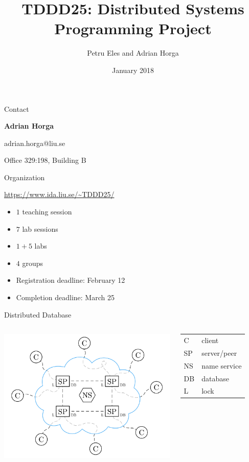 \documentclass[compress,xcolor=table]{beamer}
\title{%
  TDDD25: Distributed Systems\\%
  \vspace{0.1em}%
  Programming Project%
}
\author{Petru Eles and Adrian Horga}
\date{January 2018}
\institute[Link\"oping University]{
  Computer and Information Science\\
  Link\"oping University
}
\begin{document}
\frame[plain]{\titlepage}

\begin{frame}{Contact}
\begin{center}
  \textbf{Adrian Horga}

  adrian.horga@liu.se

  Office 329:198, Building B

\end{center}
\end{frame}

\begin{frame}{Organization}
  \begin{center}
    \url{https://www.ida.liu.se/~TDDD25/}
  \end{center}
  \begin{itemize}
    \item $1$ teaching session
    \item $7$ lab sessions
    \item $1 + 5$ labs
    \item $4$ groups
    \item Registration deadline: February 12
    \item Completion deadline: March 25
  \end{itemize}
\end{frame}

\begin{frame}{Distributed Database}
\begin{columns}
  \column{7cm}
  \centering
  \includegraphics[scale=0.14,page=1]{include/assets/distributed-database}
  \column{3cm}
  \begin{tabular}{l @{ --- } l}
    \alert{C}  & client \\
    \alert{SP} & server/peer \\
    \alert{NS} & name service \\
    \alert{DB} & database \\
    \alert{L}  & lock
  \end{tabular}
\end{columns}
\end{frame}
\end{document}
